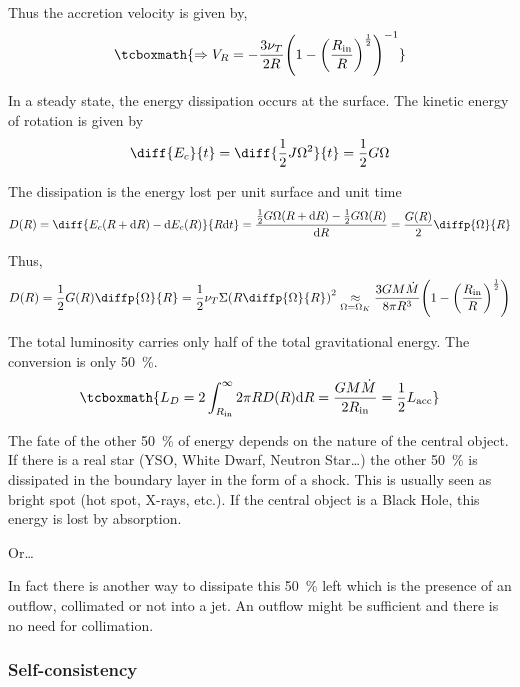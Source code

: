 \documentclass[10pt,a4paper,english]{article}
\let\originalleft\left
\let\originalright\right
\renewcommand{\left}{\mathopen{}\mathclose\bgroup\originalleft}
\renewcommand{\right}{\aftergroup\egroup\originalright}
\begin{document}
Thus the accretion velocity is given by,
\begin{equation}
    \tcboxmath{
        \Rightarrow V_R = - \frac{3 \nu_T}{2 R} \left(1 - \left(\frac{R_\mathrm{in}}{R}\right)^\frac{1}{2}\right)^{-1}
    }
\end{equation}

In a steady state, the energy dissipation occurs at the surface. The kinetic
energy of rotation is given by
\begin{equation*}
    \diff{E_c}{t} = \diff{\frac{1}{2} J \Omega^2}{t} = \frac{1}{2} G \Omega
\end{equation*}

The dissipation is the energy lost per unit surface and unit time
\begin{equation*}
    D(R) = \diff{E_c(R+\d{R}) - \d{E_c(R)}}{R \d{t}} = \frac{\frac{1}{2} G \Omega(R+\d{R}) - \frac{1}{2} G \Omega(R)}{\d{R}} = \frac{G(R)}{2} \diffp{\Omega}{R}
\end{equation*}

Thus,
\begin{equation*}
    D(R) = \frac{1}{2} G(R) \diffp{\Omega}{R} = \frac{1}{2} \nu_T \Sigma \left( R \diffp{\Omega}{R} \right)^2 \underset{\Omega = \Omega_K}{\approx}
    \frac{3 G M \dot{M}}{8 \pi R^3} \left(1 - \left(\frac{R_\mathrm{in}}{R}\right)^\frac{1}{2}\right)
\end{equation*}

The total luminosity carries only half of the total gravitational energy. The
conversion is only \SI{50}{\percent}.
\begin{equation}
    \tcboxmath{
        L_D = 2 \int_{R_\mathrm{in}}^{\infty} 2 \pi R D(R) \d{R} = \frac{G M \dot{M}}{2 R_\mathrm{in}} = \frac{1}{2} L_\mathrm{acc}
    }
\end{equation}

The fate of the other \SI{50}{\percent} of energy depends on the nature of the
central object. If there is a real star (YSO, White Dwarf, Neutron Star…) the
other \SI{50}{\percent} is dissipated in the boundary layer in the form of a
shock. This is usually seen as bright spot (hot spot, X-rays, etc.). If the
central object is a Black Hole, this energy is lost by absorption.

Or…

In fact there is another way to dissipate this \SI{50}{\percent} left which is
the presence of an outflow, collimated or not into a jet. An outflow might be
sufficient and there is no need for collimation.

\subsubsection{Self-consistency}
\end{document}
